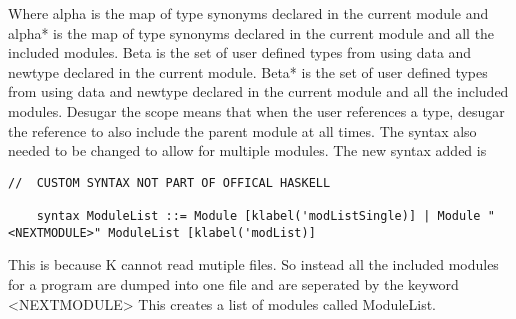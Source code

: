 Where alpha is the map of type synonyms declared in the current module and alpha* is the map of type synonyms declared in the current module and all the included modules. Beta is the set of user defined types from using data and newtype declared in the current module. Beta* is the set of user defined types from using data and newtype declared in the current module and all the included modules. 
Desugar the scope means that when the user references a type, desugar the reference to also include the parent module at all times.
The syntax also needed to be changed to allow for multiple modules. The new syntax added is
\begin{lstlisting}
//  CUSTOM SYNTAX NOT PART OF OFFICAL HASKELL

    syntax ModuleList ::= Module [klabel('modListSingle)] | Module "<NEXTMODULE>" ModuleList [klabel('modList)]
\end{lstlisting}

This is because K cannot read mutiple files. So instead all the included modules for a program are dumped into one file and are seperated by the keyword <NEXTMODULE>
This creates a list of modules called ModuleList.
